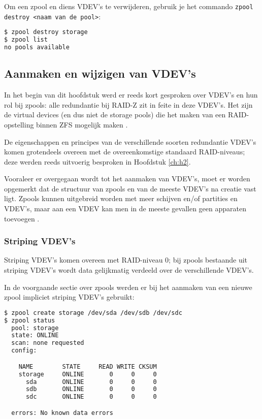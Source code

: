 Om een zpool en diens VDEV's te verwijderen, gebruik je het commando \texttt{zpool destroy <naam van de pool>}:

\begin{lstlisting}[language=bash,style=command_style]
$ zpool destroy storage
$ zpool list
no pools available
\end{lstlisting}

\clearpage

\subsection{Aanmaken en wijzigen van VDEV's}

In het begin van dit hoofdstuk werd er reeds kort gesproken over VDEV's en hun rol bij zpools: alle redundantie bij RAID-Z zit in feite in deze VDEV's. Het zijn de virtual devices (en dus niet de storage pools) die het maken van een RAID-opstelling binnen ZFS mogelijk maken \autocite{Lucas2015}.

De eigenschappen en principes van de verschillende soorten redundantie VDEV's komen grotendeels overeen met de overeenkomstige standaard RAID-niveaus; deze werden reeds uitvoerig besproken in Hoofdstuk \ref{ch:h2}.

Vooraleer er overgegaan wordt tot het aanmaken van VDEV's, moet er worden opgemerkt dat de structuur van zpools en van de meeste VDEV's na creatie vast ligt. Zpools kunnen uitgebreid worden met meer schijven en/of partities en VDEV's, maar aan een VDEV kan men in de meeste gevallen geen apparaten toevoegen \autocite{FBSDDP2017}. 

\subsubsection{Striping VDEV's}

Striping VDEV's komen overeen met RAID-niveau 0; bij zpools bestaande uit striping VDEV's wordt data gelijkmatig verdeeld over de verschillende VDEV's.

In de voorgaande sectie over zpools werden er bij het aanmaken van een nieuwe zpool impliciet striping VDEV's gebruikt:

\begin{lstlisting}[language=bash,style=command_style]
$ zpool create storage /dev/sda /dev/sdb /dev/sdc
$ zpool status
  pool: storage
  state: ONLINE
  scan: none requested
  config:

	NAME        STATE     READ WRITE CKSUM
	storage     ONLINE       0     0     0
	  sda       ONLINE       0     0     0
	  sdb       ONLINE       0     0     0
	  sdc       ONLINE       0     0     0

  errors: No known data errors
\end{lstlisting}

